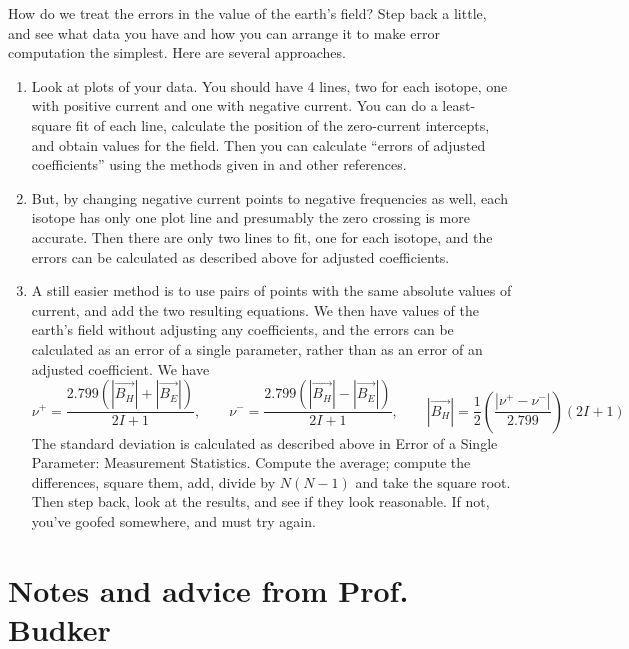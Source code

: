 \documentclass{../lab}
\begin{document}
How do we treat the errors in the value of the earth's field? Step back a little, and see what data you have and how you can arrange it to make error computation the simplest. Here are several approaches.
\begin{enumerate}
    \item Look at plots of your data. You should have 4 lines, two for each isotope, one with positive current and one with negative current. You can do a least-square fit of each line, calculate the position of the zero-current intercepts, and obtain values for the field. Then you can calculate ``errors of adjusted coefficients'' using the methods given in \citeauthor{Lyons} and other references.

    \item But, by changing negative current points to negative frequencies as well, each isotope has only one plot line and presumably the zero crossing is more accurate. Then there are only two lines to fit, one for each isotope, and the errors can be calculated as described above for adjusted coefficients.

    \item A still easier method is to use pairs of points with the same absolute values of current, and add the two resulting equations. We then have values of the earth's field without adjusting any coefficients, and the errors can be calculated as an error of a single parameter, rather than as an error of an adjusted coefficient. We have
    \[
    \nu^+ = \frac{2.799 (|\overrightarrow{B_H}|
        + |\overrightarrow{B_E}|)}{2I + 1}, \qquad
    \nu^- = \frac{2.799 (|\overrightarrow{B_H}|
        - |\overrightarrow{B_E}|)}{2I + 1}, \qquad
    |\overrightarrow{B_H}| =
        \frac{1}{2}\left(\frac{|\nu^+ - \nu^-|}{2.799}\right)(2I + 1)
    \]
    The standard deviation is calculated as described above in Error of a Single Parameter: Measurement Statistics. Compute the average; compute the differences, square them, add, divide by $N(N - 1)$ and take the square root. Then step back, look at the results, and see if they look reasonable. If not, you've goofed somewhere, and must try again.
\end{enumerate}

\section{Notes and advice from Prof. Budker}
\end{document}
